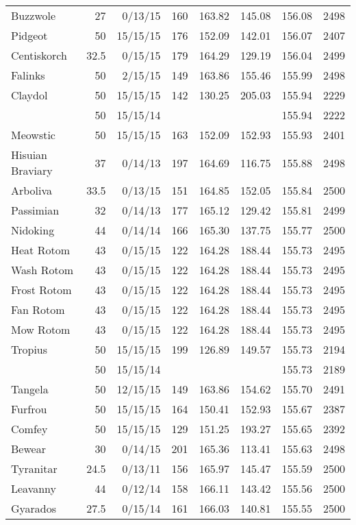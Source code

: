 \begin{longtable}{lrrrrrrr}
Buzzwole & 27 & 0/13/15 & 160 & 163.82 & 145.08 & 156.08 & 2498\\
Pidgeot & 50 & 15/15/15 & 176 & 152.09 & 142.01 & 156.07 & 2407\\
Centiskorch & 32.5 & 0/15/15 & 179 & 164.29 & 129.19 & 156.04 & 2499\\
Falinks & 50 & 2/15/15 & 149 & 163.86 & 155.46 & 155.99 & 2498\\
Claydol & 50 & 15/15/15 & 142 & 130.25 & 205.03 & 155.94 & 2229\\
 & 50 & 15/15/14 & & & & 155.94 & 2222\\
Meowstic & 50 & 15/15/15 & 163 & 152.09 & 152.93 & 155.93 & 2401\\
Hisuian Braviary & 37 & 0/14/13 & 197 & 164.69 & 116.75 & 155.88 & 2498\\
Arboliva & 33.5 & 0/13/15 & 151 & 164.85 & 152.05 & 155.84 & 2500\\
Passimian & 32 & 0/14/13 & 177 & 165.12 & 129.42 & 155.81 & 2499\\
Nidoking & 44 & 0/14/14 & 166 & 165.30 & 137.75 & 155.77 & 2500\\
Heat Rotom & 43 & 0/15/15 & 122 & 164.28 & 188.44 & 155.73 & 2495\\
Wash Rotom & 43 & 0/15/15 & 122 & 164.28 & 188.44 & 155.73 & 2495\\
Frost Rotom & 43 & 0/15/15 & 122 & 164.28 & 188.44 & 155.73 & 2495\\
Fan Rotom & 43 & 0/15/15 & 122 & 164.28 & 188.44 & 155.73 & 2495\\
Mow Rotom & 43 & 0/15/15 & 122 & 164.28 & 188.44 & 155.73 & 2495\\
Tropius & 50 & 15/15/15 & 199 & 126.89 & 149.57 & 155.73 & 2194\\
 & 50 & 15/15/14 & & & & 155.73 & 2189\\
Tangela & 50 & 12/15/15 & 149 & 163.86 & 154.62 & 155.70 & 2491\\
Furfrou & 50 & 15/15/15 & 164 & 150.41 & 152.93 & 155.67 & 2387\\
Comfey & 50 & 15/15/15 & 129 & 151.25 & 193.27 & 155.65 & 2392\\
Bewear & 30 & 0/14/15 & 201 & 165.36 & 113.41 & 155.63 & 2498\\
Tyranitar & 24.5 & 0/13/11 & 156 & 165.97 & 145.47 & 155.59 & 2500\\
Leavanny & 44 & 0/12/14 & 158 & 166.11 & 143.42 & 155.56 & 2500\\
Gyarados & 27.5 & 0/15/14 & 161 & 166.03 & 140.81 & 155.55 & 2500\\

\end{longtable}

